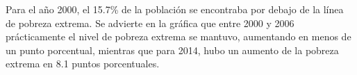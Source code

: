 Para el año 2000, el 15.7\% de la población se encontraba por debajo de la línea de pobreza extrema. Se advierte en la gráfica que entre 2000 y 2006 prácticamente el nivel de pobreza extrema se mantuvo, aumentando en menos de un punto porcentual, mientras que para 2014, hubo un aumento de la pobreza extrema en 8.1 puntos porcentuales.